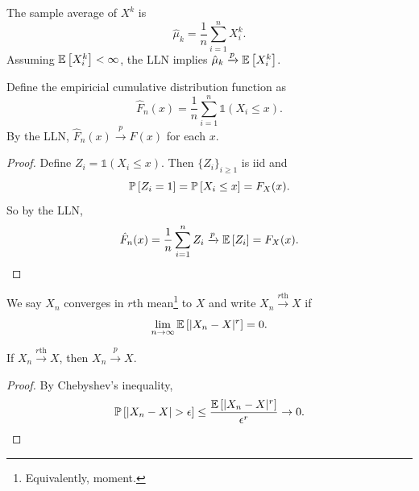 \begin{remark}	The sample average of $X^k$ is
	\[
		\hat\mu_k=\frac{1}{n}\sum_{i=1}^n X_i^k.
	\]
	Assuming $\E\left[X_i^k\right]<\infty$, the LLN implies $\hat\mu_k\xrightarrow{p}\E\left[X_i^k\right]$.
\end{remark}

\begin{proposition}	Define the empiricial cumulative distribution function as
	\[
		\hat F_n(x)=\frac{1}{n}\sum_{i=1}^n \mathds{1}(X_i\le x).
	\]
	By the LLN, $\hat F_n(x)\xrightarrow{p}F(x)$ for each $x$.
\end{proposition}

\begin{proof}
	Define $Z_i=\mathds{1}(X_i\le x)$. Then $\{Z_i\}_{i\ge 1}$ is iid and
	\[
		\P\left[Z_i=1\right]=\P\left[X_i\le x\right]=F_X(x).
	\]
	So by the LLN,
	\[
		\hat F_n(x)=\frac{1}{n}\sum_{i=1}^n Z_i\xrightarrow{p}\E\left[Z_i\right]=F_X(x).
	\]
\end{proof}

\begin{definition}
	We say $X_n$ converges in $r$th mean\footnote{Equivalently, moment.} to $X$ and write $X_n\xrightarrow{r\text{th}}X$ if
	\[
		\lim_{n\to\infty}\E\left[|X_n-X|^r\right]=0.
	\]
\end{definition}

\begin{proposition}	If $X_n\xrightarrow{r\text{th}}X$, then $X_n\xrightarrow{p}X$.
\end{proposition}

\begin{proof}
	By Chebyshev's inequality,
	\[
		\P\left[|X_n-X|>\epsilon\right]\le\frac{\E\left[|X_n-X|^r\right]}{\epsilon^r}\to 0.
	\]
\end{proof}

